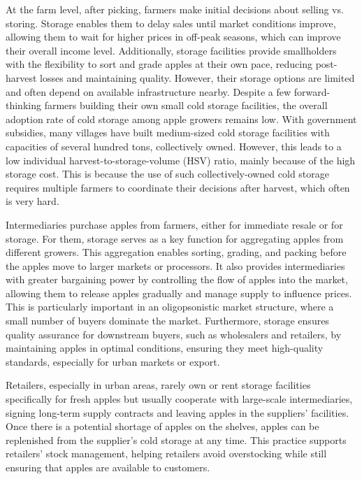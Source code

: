At the farm level, after picking, farmers make initial decisions about selling vs. storing. Storage enables them to delay sales until market conditions improve, allowing them to wait for higher prices in off-peak seasons, which can improve their overall income level. Additionally, storage facilities provide smallholders with the flexibility to sort and grade apples at their own pace, reducing post-harvest losses and maintaining quality. However, their storage options are limited and often depend on available infrastructure nearby. Despite a few forward-thinking farmers building their own small cold storage facilities, the overall adoption rate of cold storage among apple growers remains low. With government subsidies, many villages have built medium-sized cold storage facilities with capacities of several hundred tons, collectively owned. However, this leads to a low individual harvest-to-storage-volume (HSV) ratio, mainly because of the high storage cost. This is because the use of such collectively-owned cold storage requires multiple farmers to coordinate their decisions after harvest, which often is very hard.

Intermediaries purchase apples from farmers, either for immediate resale or for storage. For them, storage serves as a key function for aggregating apples from different growers. This aggregation enables sorting, grading, and packing before the apples move to larger markets or processors. It also provides intermediaries with greater bargaining power by controlling the flow of apples into the market, allowing them to release apples gradually and manage supply to influence prices. This is particularly important in an oligopsonistic market structure, where a small number of buyers dominate the market. Furthermore, storage ensures quality assurance for downstream buyers, such as wholesalers and retailers, by maintaining apples in optimal conditions, ensuring they meet high-quality standards, especially for urban markets or export.

Retailers, especially in urban areas, rarely own or rent storage facilities specifically for fresh apples but usually cooperate with large-scale intermediaries, signing long-term supply contracts and leaving apples in the suppliers' facilities. Once there is a potential shortage of apples on the shelves, apples can be replenished from the supplier's cold storage at any time. This practice supports retailers' stock management, helping retailers avoid overstocking while still ensuring that apples are available to customers.

